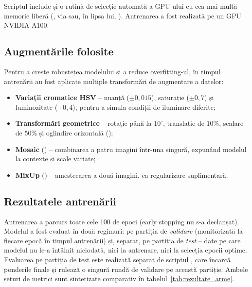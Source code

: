 \documentclass[../../main.tex]{subfiles}
\begin{document}
Scriptul include și o rutină de selecție automată a GPU-ului cu cea mai multă memorie liberă
(, via  sau, în lipsa lui, ).
Antrenarea a fost realizată pe un GPU NVIDIA A100.

\subsection{Augmentările folosite}
\label{subsec:augmentari}

Pentru a crește robustețea modelului și a reduce overfitting-ul, în timpul antrenării au fost
aplicate multiple transformări de augmentare a datelor:

\begin{itemize}
    \item \textbf{Variații cromatice HSV} -- nuanță ($\pm 0{,}015$), saturație ($\pm 0{,}7$) și
    luminozitate ($\pm 0{,}4$), pentru a simula condiții de iluminare diferite;
    \item \textbf{Transformări geometrice} -- rotație până la $10^{\circ}$, translație de
    $10\%$, scalare de $50\%$ și oglindire orizontală ();
    \item \textbf{Mosaic} () -- combinarea a patru imagini într-una
    singură, expunând modelul la contexte și scale variate;
    \item \textbf{MixUp} () -- amestecarea a două imagini, ca regularizare
    suplimentară.
\end{itemize}

\subsection{Rezultatele antrenării}
\label{subsec:rezultate_arme}

Antrenarea a parcurs toate cele 100 de epoci (early stopping nu s-a declanșat). Modelul a fost
evaluat în două regimuri: pe partiția de \textit{validare} (monitorizată la fiecare epocă în timpul
antrenării) și, separat, pe partiția de \textit{test} -- date pe care modelul nu le-a întâlnit
niciodată, nici la antrenare, nici la selecția epocii optime. Evaluarea pe partiția de test este
realizată separat de scriptul , care încarcă ponderile finale
 și rulează o singură rundă de validare pe această partiție. Ambele seturi de
metrici sunt sintetizate comparativ în tabelul~\ref{tab:rezultate_arme}.
\end{document}
